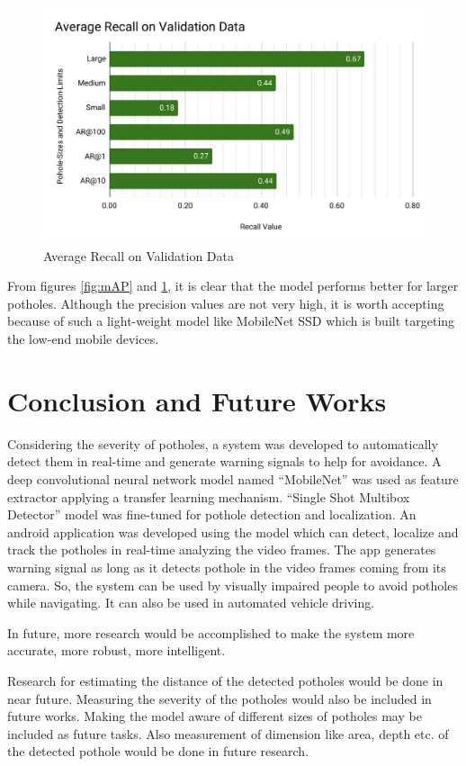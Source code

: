 \documentclass[conference]{IEEEtran}
\begin{document}
\begin{figure}[h]
  \centering
  \includegraphics[width=.95\columnwidth]{img/Average-Recall-on-Validation-Data}
  \caption{Average Recall on Validation Data}
  \label{fig:AR}
\end{figure}
      
From figures \ref{fig:mAP} and \ref{fig:AR}, it is clear that the model performs better for larger potholes. Although the precision values are not very high, it is worth accepting because of such a light-weight model like MobileNet SSD which is built targeting the low-end mobile devices\cite{howard2017mobilenets}.
  
\section{Conclusion and Future Works}
Considering the severity of potholes, a system was developed to automatically detect them in real-time and generate warning signals to help for avoidance. A deep convolutional neural network model named ``MobileNet'' was used as feature extractor applying a transfer learning mechanism. ``Single Shot Multibox Detector'' model was fine-tuned for pothole detection and localization. An android application was developed using the model which can detect, localize and track the potholes in real-time analyzing the video frames. The app generates warning signal as long as it detects pothole in the video frames coming from its camera. So, the system can be used by visually impaired people to avoid potholes while navigating. It can also be used in automated vehicle driving.
  
In future, more research would be accomplished to make the system more accurate, more robust, more intelligent.
  
Research for estimating the distance of the detected potholes would be done in near future. Measuring the severity of the potholes would also be included in future works. Making the model aware of different sizes of potholes may be included as future tasks. Also measurement of dimension like area, depth etc. of the detected pothole would be done in future research.
\\
\vspace{1cm}%


\end{document}
